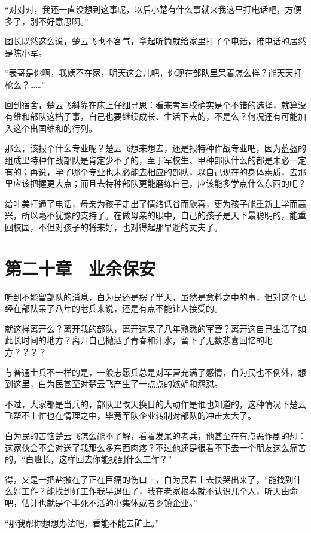 “对对对，我还一直没想到这事呢，以后小楚有什么事就来我这里打电话吧，方便多了，别不好意思啊。”

团长既然这么说，楚云飞也不客气，拿起听筒就给家里打了个电话，接电话的居然是陈小军。

“表哥是你啊，我姨不在家，明天这会儿吧，你现在部队里呆着怎么样？能天天打枪么？……”

回到宿舍，楚云飞斜靠在床上仔细寻思：看来考军校确实是个不错的选择，就算没有维和部队这档子事，自己也要继续成长、生活下去的，不是么？何况还有可能加入这个出国维和的行列。

那么，该报个什么专业呢？楚云飞想来想去，还是报特种作战专业吧，因为蓝盔的组成里特种作战部队是肯定少不了的，至于军校生、甲种部队什么的都是未必一定有的；再说，学了哪个专业也未必能去相应的部队，以自己现在的身体素质，去那里应该把握更大点；而且去特种部队更能磨练自己，应该能多学点什么东西的吧？

给叶美打通了电话，母亲为孩子走出了情绪低谷而欣喜，更为孩子能重新上学而高兴，所以毫不犹豫的支持了。在做母亲的眼中，自己的孩子是天下最聪明的，能重回校园，不但对孩子的将来好，也对得起那早逝的丈夫了。

\section{第二十章　业余保安}

听到不能留部队的消息，白为民还是楞了半天，虽然是意料之中的事，但对这个已经在部队呆了八年的老兵来说，还是有点不能让人接受的。

就这样离开么？离开我的部队，离开这呆了八年熟悉的军营？离开这自己生活了如此长时间的地方？离开自己抛洒了青春和汗水，留下了无数悲喜回忆的地方？？？？

与普通士兵不一样的是，一般志愿兵总是对军营充满了感情，白为民也不例外，想到这里，白为民甚至对楚云飞产生了一点点的嫉妒和怨怼。

不过，大家都是当兵的，部队里改天换日的大动作是谁也知道的，这种情况下楚云飞帮不上忙也在情理之中，毕竟军队企业转制对部队的冲击太大了。

白为民的苦恼楚云飞怎么能不了解，看着发呆的老兵，他甚至在有点恶作剧的想：这家伙会不会对送了我那么多东西肉疼？不过他还是很看不下去一个朋友这么痛苦的，“白班长，这样回去你能找到什么工作？”

得，又是一把盐撒在了正在巨痛的伤口上，白为民看上去快哭出来了，“能找到什么好工作？能找到好工作我早退伍了，我在老家根本就不认识几个人，听天由命吧，估计也就是个半死不活的小集体或者乡镇企业。”

“那我帮你想想办法吧，看能不能去矿上。”

